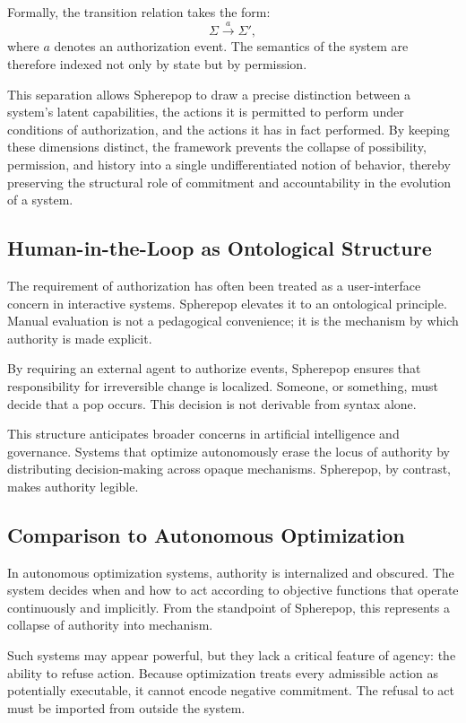 \documentclass[11pt]{article}
\begin{document}
Formally, the transition relation takes the form:
\[
\Sigma \xrightarrow{\,a\,} \Sigma',
\]
where $a$ denotes an authorization event. The semantics of the system are therefore indexed not only by state but by permission.

This separation allows Spherepop to draw a precise distinction between a system’s latent capabilities, the actions it is permitted to perform under conditions of authorization, and the actions it has in fact performed. By keeping these dimensions distinct, the framework prevents the collapse of possibility, permission, and history into a single undifferentiated notion of behavior, thereby preserving the structural role of commitment and accountability in the evolution of a system.

\subsection{Human-in-the-Loop as Ontological Structure}

The requirement of authorization has often been treated as a user-interface concern in interactive systems. Spherepop elevates it to an ontological principle. Manual evaluation is not a pedagogical convenience; it is the mechanism by which authority is made explicit.

By requiring an external agent to authorize events, Spherepop ensures that responsibility for irreversible change is localized. Someone, or something, must decide that a pop occurs. This decision is not derivable from syntax alone.

This structure anticipates broader concerns in artificial intelligence and governance. Systems that optimize autonomously erase the locus of authority by distributing decision-making across opaque mechanisms. Spherepop, by contrast, makes authority legible.

\subsection{Comparison to Autonomous Optimization}

In autonomous optimization systems, authority is internalized and obscured. The system decides when and how to act according to objective functions that operate continuously and implicitly. From the standpoint of Spherepop, this represents a collapse of authority into mechanism.

Such systems may appear powerful, but they lack a critical feature of agency: the ability to refuse action. Because optimization treats every admissible action as potentially executable, it cannot encode negative commitment. The refusal to act must be imported from outside the system.
\end{document}
